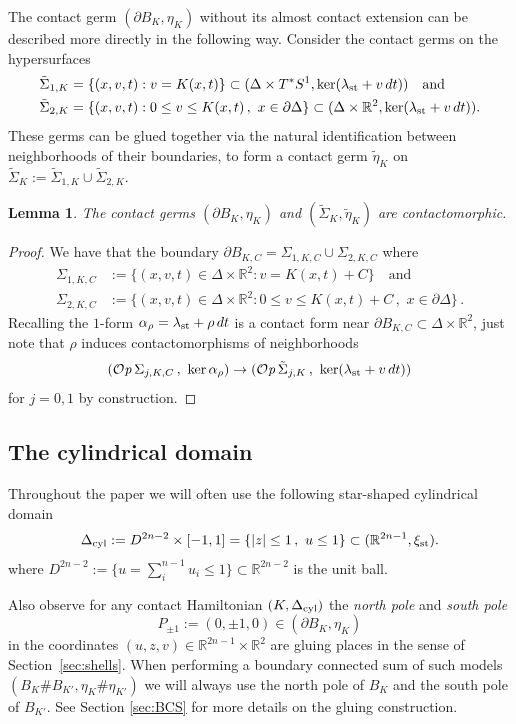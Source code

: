\documentclass[12pt]{paper}
\theoremstyle{plain}
\newtheorem{lemma}[theorem]{Lemma}
\theoremstyle{definition}
\newcommand{\p}{\partial}
\newcommand{\abs}[1]{\left| #1 \right|}
\newcommand{\R}{{\mathbb{R}}}
\newcommand{\st}{{\rm st}}
\newcommand{\cyl}{{\rm cyl}}
\def\Op{{\mathcal O}{\it p}\,}
\numberwithin{figure}{section}
\begin{document}
The contact germ $(\p B_K, \eta_K)$ without its almost contact extension can be described more directly in the following way.
Consider the contact germs on the hypersurfaces
\begin{align*}
	\tilde\Sigma_{1,K} &= \{(x,v,t): v = K(x,t)\} \subset (\Delta \times T^*S^1, \ker(\lambda_{\st} + v\,dt)) \quad\mbox{and}\\
	\tilde\Sigma_{2,K} &= \{(x,v,t): 0 \leq v \leq K(x, t)\,,\,\, x \in \p \Delta\} \subset (\Delta \times \R^2, \ker(\lambda_{\st} + v\,dt)).
\end{align*}
These germs can be glued together via the natural identification between neighborhoods of their boundaries,
to form a contact germ $\tilde{\eta}_K$ on $\tilde{\Sigma}_K := \tilde\Sigma_{1,K} \cup \tilde\Sigma_{2,K}$.
\begin{lemma}\label{l:EasyCircleGerm}
	The contact germs $(\p B_K, \eta_K)$ and $(\tilde{\Sigma}_K, \tilde{\eta}_K)$ are contactomorphic.
\end{lemma}
\begin{proof}
	We have that the boundary $\p B_{K, C} = \Sigma_{1,K, C} \cup \Sigma_{2,K, C}$ where
\begin{align*}
		\Sigma_{1,K,C} &:= \{(x,v,t) \in \Delta \times \R^2: v = K(x,t)+C\} \quad\mbox{and} \\
	         \Sigma_{2,K,C} &:= \{(x,v,t) \in \Delta \times \R^2: 0 \leq v \leq K(x, t)+C\,,\,\, x \in \p \Delta\}\,.
\end{align*}
	Recalling the $1$-form $\alpha_\rho = \lambda_{\st} + \rho\,dt$ is a contact form 
	near $\p B_{K,C} \subset \Delta \times \R^2$, just note that
	$\rho$ induces contactomorphisms of neighborhoods
	$$
		(\Op \Sigma_{j,K,C}\,,\,\, \ker \alpha_\rho) \to (\Op \tilde\Sigma_{j,K}\,,\,\, \ker(\lambda_{\st} + v\,dt))
	$$
	for $j=0,1$ by construction.
\end{proof}

\subsection{The cylindrical domain}

Throughout the paper we will often use the following star-shaped cylindrical domain
$$
	 \Delta_\cyl := D^{2n-2}\times[-1,1] = \{\abs{z} \leq 1\,,\,\, u \leq 1\} \subset (\R^{2n-1}, \xi_{\st}).
$$
where $D^{2n-2}:= \{u=\sum_i^{n-1}u_i\leq 1\}\subset\R^{2n-2}$ is the unit ball.  

Also observe for any contact Hamiltonian $(K, \Delta_{\cyl})$ the \emph{north pole} and \emph{south pole}
$$
	P_{\pm 1} := (0, \pm 1, 0) \in (\p B_K, \eta_K)
$$
in the coordinates $(u, z, v) \in \R^{2n-1} \times \R^{2}$ are gluing places in the sense of Section~\ref{sec:shells}.
When performing a boundary connected sum of such models $(B_{K}\# B_{K'}, \eta_{K}\#\eta_{K'})$ we will always use the north
pole of $B_K$ and the south pole of $B_{K'}$.  See Section \ref{sec:BCS} for more details on the gluing construction.
\end{document}
